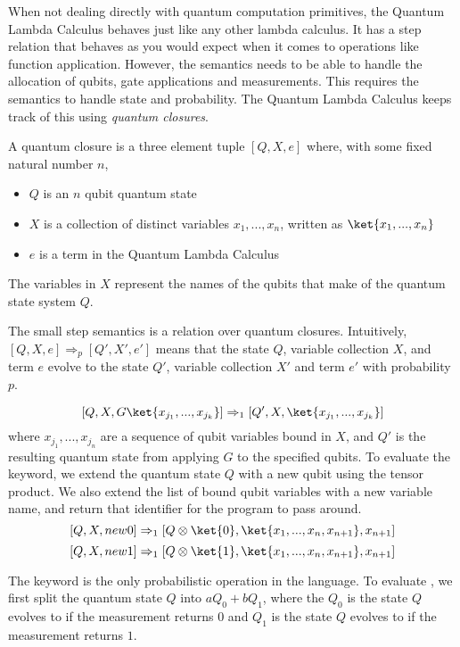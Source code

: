 When not dealing directly with quantum computation primitives, the Quantum Lambda Calculus behaves just like any other lambda calculus.
It has a step relation that behaves as you would expect when it comes to operations like function application.
However, the semantics needs to be able to handle the allocation of qubits, gate applications and measurements. 
This requires the semantics to handle state and probability.
The Quantum Lambda Calculus keeps track of this using \textit{quantum closures}.
\begin{definition}
    A quantum closure is a three element tuple $[Q,X,e]$ where, with some fixed natural number $n$,
    \begin{itemize}
        \item $Q$ is an $n$ qubit quantum state
        \item $X$ is a collection of distinct variables $x_1,..., x_n$, written as $\ket{x_1,..., x_n}$
        \item $e$ is a term in the Quantum Lambda Calculus
    \end{itemize}
    The variables in $X$ represent the names of the qubits that make of the quantum state system $Q$.
\end{definition}
The small step semantics is a relation over quantum closures. 
Intuitively, $[Q,X,e] \Rightarrow_{p} [Q',X',e']$ means that the state $Q$, variable collection $X$, and term $e$ evolve to the state $Q'$, variable collection $X'$ and term $e'$ with probability $p$.

\[ 
    [Q,X, G \ket{x_{j_1},...,x_{j_k}}] \Rightarrow_{1} [Q',X, \ket{x_{j_1},...,x_{j_k}}]
\]
where $x_{j_1},...,x_{j_n}$ are a sequence of qubit variables bound in $X$, and $Q'$ is the resulting quantum state from applying $G$ to the specified qubits.
To evaluate the  keyword, we extend the quantum state $Q$ with a new qubit using the tensor product.
We also extend the list of bound qubit variables with a new variable name, and return that identifier for the program to pass around.
\[
    [Q,X, new 0] \Rightarrow_1 [Q \otimes \ket{0}, \ket{x_1,...,x_n,x_{n+1}}, x_{n+1}]    
\]
\[
    [Q,X, new 1] \Rightarrow_1 [Q \otimes \ket{1}, \ket{x_1,...,x_n,x_{n+1}}, x_{n+1}]    
\]

The  keyword is the only probabilistic operation in the language.
To evaluate , we first split the quantum state $Q$ into $aQ_0 + bQ_1$, where the $Q_0$ is the state $Q$ evolves to if the measurement returns $0$ and $Q_1$ is the state $Q$ evolves to if the measurement returns $1$.


